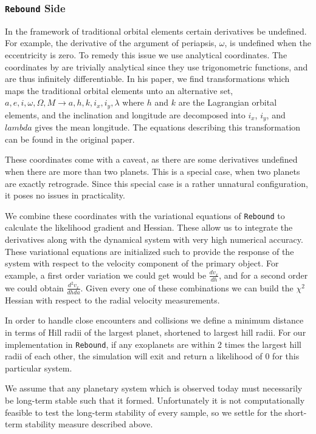 \documentclass{aa}
\begin{document}
\subsubsection{\texttt{Rebound} Side}\label{analytical}
In the framework of traditional orbital elements certain derivatives be undefined. For example, the derivative of the argument of periapsis, $\omega$, is undefined when the eccentricity is zero. To remedy this issue we use analytical coordinates. The coordinates by \cite{Pl2009} are trivially analytical since they use trigonometric functions, and are thus infinitely differentiable. In his paper, we find transformations which maps the traditional orbital elements unto an alternative set, $a, e, i, \omega, \Omega, M \to a, h, k, i_x, i_y, \lambda$ where $h$ and $k$ are the Lagrangian orbital elements, and the inclination and longitude are decomposed into $i_x$, $i_y$, and $lambda$ gives the mean longitude. The equations describing this transformation  can be found in the original paper. 

These coordinates come with a caveat, as there are some derivatives undefined when there are more than two planets. This is a special case, when two planets are exactly retrograde. Since this special case is a rather unnatural configuration, it poses no issues in practicality.

We combine these coordinates with the variational equations of \texttt{Rebound} to calculate the likelihood gradient and Hessian. These allow us to integrate the derivatives along with the dynamical system with very high numerical accuracy. These variational equations are initialized such to provide the response of the system with respect to the velocity component of the primary object. For example, a first order variation we could get would be $\frac{dv_x}{dh}$, and for a second order we could obtain $\frac{d^2v_x}{dhda}$. Given every one of these combinations we can build the $\chi^2$ Hessian with respect to the radial velocity measurements.

In order to handle close encounters and collisions we define a minimum distance in terms of Hill radii of the largest planet, shortened to largest hill radii. For our implementation in \texttt{Rebound}, if any exoplanets are within 2 times the largest hill radii of each other, the simulation will exit and return a likelihood of $0$ for this particular system. 

We assume that any planetary system which is observed today must necessarily be long-term stable such that it formed. Unfortunately it is not computationally feasible to test the long-term stability of every sample, so we settle for the short-term stability measure described above.
\end{document}

